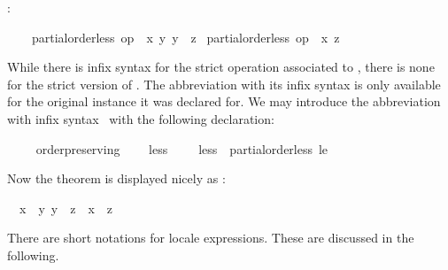 \begin{isabellebody}
\begin{isamarkuptext}
  \hspace*{1em}:
  \begin{isabelle}%
\ \ \ \ {\isasymlbrakk}partial{\isacharunderscore}order{\isachardot}less\ op\ {\isasympreceq}\ {\isacharquery}x\ {\isacharquery}y{\isacharsemicolon}\ {\isacharquery}y\ {\isasympreceq}\ {\isacharquery}z{\isasymrbrakk}\isanewline
\isaindent{\ \ \ \ }{\isasymLongrightarrow}\ partial{\isacharunderscore}order{\isachardot}less\ op\ {\isasympreceq}\ {\isacharquery}x\ {\isacharquery}z%
\end{isabelle}
  While there is infix syntax for the strict operation associated to
  , there is none for the strict version of .  The abbreviation  with its infix syntax is only
  available for the original instance it was declared for.  We may
  introduce the abbreviation  with infix syntax~\isa{{\isasymprec}}
  with the following declaration:%
\end{isamarkuptext}%
\isamarkuptrue%
\ \ \isamarkupfalse%
\ {\isacharparenleft}\ order{\isacharunderscore}preserving{\isacharparenright}\isanewline
\ \ \ \ less{\isacharprime}\ {\isacharparenleft}\ {\isachardoublequoteopen}{\isasymprec}{\isachardoublequoteclose}\ {}{}{\isacharparenright}\ \ {\isachardoublequoteopen}less{\isacharprime}\ {\isasymequiv}\ partial{\isacharunderscore}order{\isachardot}less\ le{\isacharprime}{\isachardoublequoteclose}%
\begin{isamarkuptext}%
Now the theorem is displayed nicely as
  :
  \begin{isabelle}%
\ \ {\isasymlbrakk}{\isacharquery}x\ {\isasymprec}\ {\isacharquery}y{\isacharsemicolon}\ {\isacharquery}y\ {\isasympreceq}\ {\isacharquery}z{\isasymrbrakk}\ {\isasymLongrightarrow}\ {\isacharquery}x\ {\isasymprec}\ {\isacharquery}z%
\end{isabelle}%
\end{isamarkuptext}%
\isamarkuptrue%
%
\begin{isamarkuptext}%
There are short notations for locale expressions.  These are
  discussed in the following.%
\end{isamarkuptext}%
\isamarkuptrue%
%
\isamarkuptrue%
%
\begin{isamarkuptext}%

\end{isamarkuptext}
\end{isabellebody}
